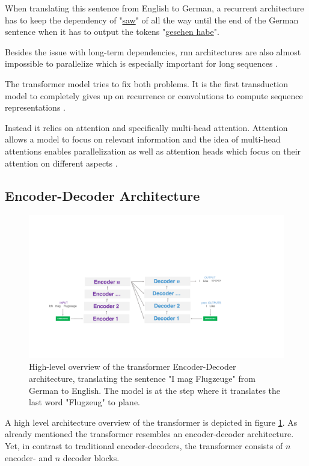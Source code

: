 When translating this sentence from English to German, a recurrent architecture has to keep the dependency of "\underline{saw}" of all the way until the end of the German sentence when it has to output the tokens "\underline{gesehen habe}".
\medskip

Besides the issue with long-term dependencies, \gls{rnn} architectures are also almost impossible to parallelize which is especially important for long sequences \cite{Vaswani2017d}.
\medskip

The transformer model tries to fix both problems. It is the first transduction model to completely gives up on recurrence or convolutions to compute sequence representations \cite{Vaswani2017d}. 

Instead it relies on attention and specifically multi-head attention. Attention allows a model to focus on relevant information and the idea of multi-head attentions enables parallelization as well as attention heads which focus on their attention on different aspects \cite{Vaswani2017d}.

\subsection{Encoder-Decoder Architecture}

\begin{figure}[htp]
	\centering
	\includegraphics[width=\textwidth]{figures/03_theory/03_transformer_Architecture_HighLevel}
	\caption{High-level overview of the transformer Encoder-Decoder architecture, translating the sentence "I mag Flugzeuge" from German to English. The model is at the step where it translates the last word "Flugzeug" to plane.}
	\label{fig:03_transformer_HighlevelOverview}
\end{figure}

A high level architecture overview of the transformer is depicted in figure \ref{fig:03_transformer_HighlevelOverview}. As already mentioned the transformer resembles an encoder-decoder architecture. Yet, in contrast to traditional encoder-decoders, the transformer consists of $n$ encoder- and $n$ decoder blocks. 
\medskip

